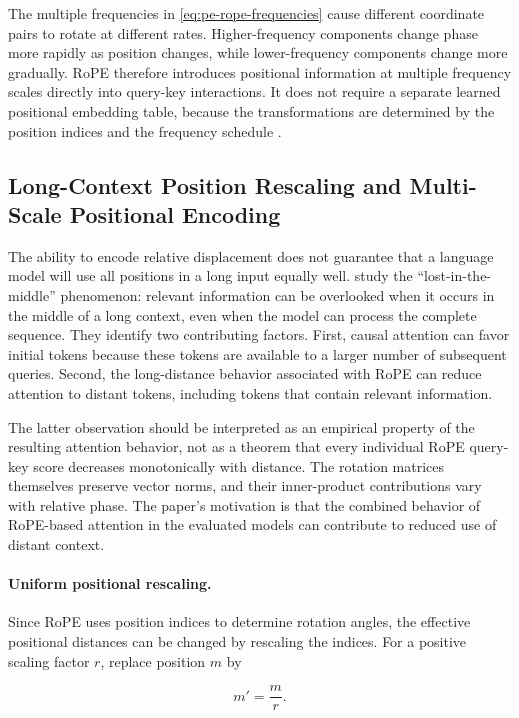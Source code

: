 The multiple frequencies in \cref{eq:pe-rope-frequencies} cause different
coordinate pairs to rotate at different rates. Higher-frequency components
change phase more rapidly as position changes, while lower-frequency
components change more gradually. RoPE therefore introduces positional
information at multiple frequency scales directly into query-key
interactions. It does not require a separate learned positional embedding
table, because the transformations are determined by the position indices
and the frequency schedule \parencite{zhang2024foundmiddle}.

\subsection{Long-Context Position Rescaling and Multi-Scale Positional Encoding}
\label{subsec:pe-mspoe}

The ability to encode relative displacement does not guarantee that a
language model will use all positions in a long input equally well.
\textcite{zhang2024foundmiddle} study the ``lost-in-the-middle''
phenomenon: relevant information can be overlooked when it occurs in the
middle of a long context, even when the model can process the complete
sequence. They identify two contributing factors. First, causal attention
can favor initial tokens because these tokens are available to a larger
number of subsequent queries. Second, the long-distance behavior associated
with RoPE can reduce attention to distant tokens, including tokens that
contain relevant information.

The latter observation should be interpreted as an empirical property of
the resulting attention behavior, not as a theorem that every individual
RoPE query-key score decreases monotonically with distance. The rotation
matrices themselves preserve vector norms, and their inner-product
contributions vary with relative phase. The paper's motivation is that the
combined behavior of RoPE-based attention in the evaluated models can
contribute to reduced use of distant context.

\paragraph{Uniform positional rescaling.}
Since RoPE uses position indices to determine rotation angles, the
effective positional distances can be changed by rescaling the indices.
For a positive scaling factor \(r\), replace position \(m\) by

\begin{equation}
    m'=\frac{m}{r}.
    \label{eq:pe-position-rescaling}
\end{equation}

